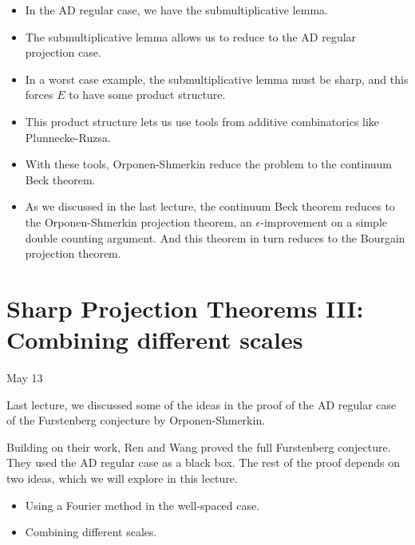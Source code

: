 \documentclass[12pt]{amsart}
\begin{document}
\begin{itemize}

\item In the AD regular case,  we have the submultiplicative lemma.  

\item  The submultiplicative lemma allows us to reduce to the AD regular projection case.  

\item  In a worst case example,  the submultiplicative lemma must be sharp, and this forces $E$ to have some product structure.

\item  This product structure lets us use tools from additive combinatorics like Plunnecke-Ruzsa.  

\item With these tools,  Orponen-Shmerkin reduce the problem to the continuum Beck theorem.

\item As we discussed in the last lecture, the continuum Beck theorem reduces to the Orponen-Shmerkin projection theorem, an $\epsilon$-improvement on a simple double counting argument.  And this theorem in turn reduces to the Bourgain projection theorem.
\end{itemize}

\newpage




















\section{Sharp Projection Theorems III: Combining different scales}

May 13

Last lecture,  we discussed some of the ideas in the proof of the AD regular case of the Furstenberg conjecture by Orponen-Shmerkin.   

Building on their work,  Ren and Wang proved the full Furstenberg conjecture.   They used the AD regular case as a black box.   The rest of the proof depends on two ideas,  which we will explore in this lecture.  

\begin{itemize}
  \item Using a Fourier method in the well-spaced case.
  \item Combining different scales.
\end{itemize}
\end{document}
